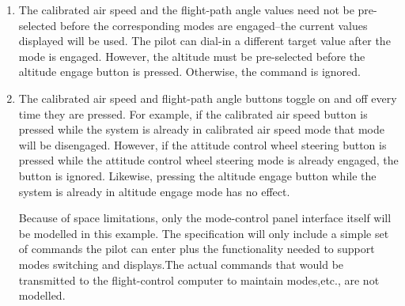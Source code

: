 \documentclass{article}
\begin{document}
\begin{enumerate}
\item The calibrated air speed and the flight-path angle values need not be pre-selected before the
corresponding modes are engaged--the current values displayed will be used. The pilot can dial-in
a different target value after the mode is engaged. However, the altitude must be pre-selected
before the altitude engage button is pressed. Otherwise, the command is ignored.

\item The calibrated air speed and flight-path angle buttons toggle on and off every time they are
pressed. For example, if the calibrated air speed button is pressed while the system is already in
calibrated air speed mode that mode will be disengaged. However, if the attitude control wheel
steering button is pressed while the attitude control wheel steering mode is already engaged, the
button is ignored. Likewise, pressing the altitude engage button while the system is already in
altitude engage mode has no effect.

Because of space limitations, only the mode-control panel interface itself will be modelled in this
example. The specification will only include a simple set of commands the pilot can enter plus the 
functionality needed to support modes switching and displays.The actual commands that would
be transmitted to the flight-control computer to maintain modes,etc., are not modelled.

\end{enumerate}
\end{document}
